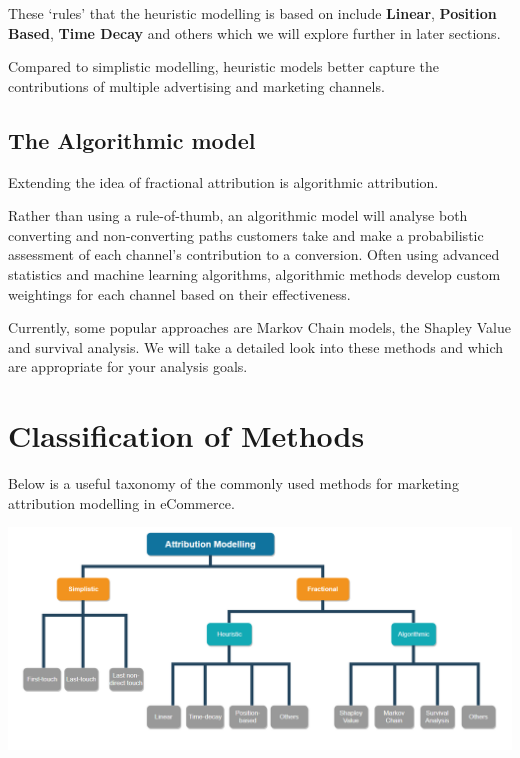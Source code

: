\documentclass[]{book}
\begin{document}
These `rules' that the heuristic modelling is based on include \textbf{Linear},
\textbf{Position Based}, \textbf{Time Decay} and others which we will explore further in
later sections.

Compared to simplistic modelling, heuristic models better capture the
contributions of multiple advertising and marketing channels.

\hypertarget{the-algorithmic-model}{%
\subsection{The Algorithmic model}\label{the-algorithmic-model}}

Extending the idea of fractional attribution is algorithmic attribution.

Rather than using a rule-of-thumb, an algorithmic model will analyse
both converting and non-converting paths customers take and make a
probabilistic assessment of each channel's contribution to a conversion. Often
using advanced statistics and machine learning algorithms, algorithmic methods
develop custom weightings for each channel based on their effectiveness.

Currently, some popular approaches are Markov Chain models, the Shapley Value and
survival analysis. We will take a detailed look into these methods and which are
appropriate for your analysis goals.

\hypertarget{classification-of-methods}{%
\section{Classification of Methods}\label{classification-of-methods}}

Below is a useful taxonomy of the commonly used methods for marketing attribution
modelling in eCommerce.

\includegraphics[width=6.72in]{img/attributionModel}
\end{document}
